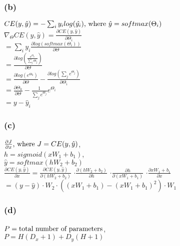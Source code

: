 \documentclass{article}
\begin{document}
\subsubsection*{(b)}
\begin{center}
    $CE(y, \hat{y}) = - \sum_{i}y_i log(\hat{y_i})
    \textnormal{, where } \hat{y} = softmax(\Theta_{i})$ \\[10pt]
    $\nabla_{\Theta}CE(y, \hat{y}) = \frac{\partial CE(y, \hat{y})}{\partial \Theta_{i}}$ \\[5pt]
    $= \sum_{i} y_{i} \frac{\partial log(softmax(\Theta_{i}))}{\partial \Theta}$ \\[5pt]
    $= \frac{\partial log(\frac{e^{\Theta_{k}}}{\sum_{j} \Theta_{j}})}{\partial \Theta}$ \\[5pt]
    $= \frac{\partial log(e^{\Theta_{k}})}{\partial \Theta} -
    \frac{\partial log(\sum_{j}e^{\Theta_{j}})}{\partial \Theta_{i}}$ \\[5pt]
    $= \frac{\partial \Theta_{k}}{\partial \Theta} - \frac{1}{\sum_{j}e^{\Theta_{j}}} e^{\Theta_{i}}$ \\[5pt]
    $= y- \hat{y}_{i}$ \\[25pt]
\end{center}

\subsubsection*{(c)}
\begin{center}

    $\frac{\partial J}{\partial x} \textnormal{, where } J = CE(y, \hat{y})$, \\[5pt]
    
    $h = sigmoid(xW_1 + b_1)$, \\[5pt]
    $\hat{y} = softmax(hW_2 + b_2)$ \\[20pt]
    
    $\frac{\partial CE(y, \hat{y})}{\partial x} = \frac{\partial CE(y, \hat{y})}{\partial (hW_2 + b_2)}$
    $\cdot \frac{\partial (hW_2 + b_2)}{\partial h}$
    $\cdot \frac{\partial h}{\partial (xW_1 + b_1)}$
    $\cdot \frac{\partial xW_1 + b_1}{\partial x}$ \\[5pt]
    $ = (y - \hat{y}) \cdot W_2 \cdot ((xW_1 + b_1) - (xW_1 + b_1)^2) \cdot W_1$ 

\end{center}

\subsubsection*{(d)}
\begin{center}
    
    $P = \textnormal{total number of parameters}$, \\
    $P = H(D_x + 1) + D_y(H + 1)$ \\[25pt]

\end{center}
\end{document}
